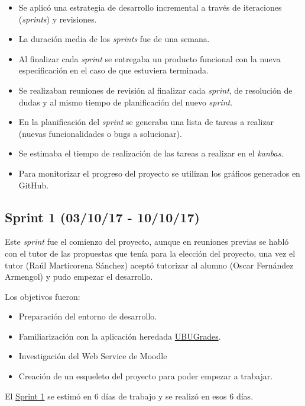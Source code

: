 \begin{itemize}
	\tightlist
	\item
	Se aplicó una estrategia de desarrollo incremental a través de
	iteraciones (\emph{sprints}) y revisiones.
	\item
	La duración media de los \emph{sprints} fue de una semana.
	\item
	Al finalizar cada \emph{sprint} se entregaba un producto funcional con la nueva especificación en el caso de que estuviera terminada.
	\item
	Se realizaban reuniones de revisión al finalizar cada \emph{sprint}, de resolución de dudas y
	al mismo tiempo de planificación del nuevo \emph{sprint}.
	\item
	En la planificación del \emph{sprint} se generaba una lista de tareas a realizar (nuevas funcionalidades o bugs a solucionar).
	\item
	Se estimaba el tiempo de realización de las tareas a realizar en el \emph{kanbas}.
	\item
	Para monitorizar el progreso del proyecto se utilizan los gráficos generados en GitHub.
	
\end{itemize}
\newpage
\subsection{Sprint 1 (03/10/17 -
	10/10/17)}\label{sprint-1-0031017---101017}
Este \emph{sprint} fue el comienzo del proyecto, aunque en reuniones previas se habló con el tutor de las propuestas que tenía para la elección del proyecto, una vez el tutor (Raúl Marticorena Sánchez) aceptó tutorizar al alumno (Oscar Fernández Armengol) y pudo empezar el desarrollo.

Los objetivos fueron:
\begin{itemize}
	\tightlist
	\item
	Preparación del entorno de desarrollo.
	\item
	Familiarización con la aplicación heredada \href{https://github.com/claumartinezh/TFG_UBUGrades}{UBUGrades}.
	\item
	Investigación del Web Service de Moodle
	\item
	Creación de un esqueleto del proyecto para poder empezar a trabajar.
	
\end{itemize}
El \href{https://github.com/trona85/GII-17.1B-UBULog-1.0/milestone/1?closed=1}{Sprint 1} se estimó en 6 días de trabajo y se realizó en esos 6 días.


